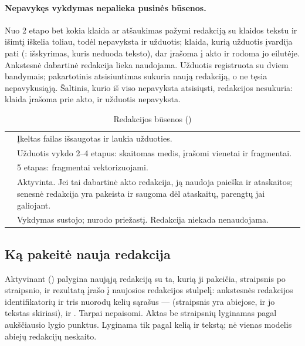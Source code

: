 \paragraph{Nepavykęs vykdymas nepalieka pusinės būsenos.} Nuo 2 etapo bet kokia klaida ar
atšaukimas pažymi redakciją  su klaidos tekstu ir išimtį iškelia toliau, todėl
nepavyksta ir užduotis; klaida, kurią užduotis įvardija pati (: išskyrimas, kuris
neduoda teksto), dar įrašoma į akto  ir rodoma jo eilutėje. Ankstesnė dabartinė
redakcija lieka naudojama. Užduotis registruota su dviem bandymais; pakartotinis atsisiuntimas
sukuria naują redakciją, o ne tęsia nepavykusiąją. Šaltinis, kurio iš viso nepavyksta atsisiųsti,
redakcijos nesukuria: klaida įrašoma prie akto, ir užduotis nepavyksta.

\begin{table}[H]
\caption{Redakcijos būsenos ()}\label{tab:corpus:status}
\begin{tabularx}{\textwidth}{@{}L{22mm}Y@{}}
\toprule
{} &  \\
\midrule
{} & Įkeltas failas išsaugotas ir laukia užduoties. \\
 & Užduotis vykdo 2--4 etapus: skaitomas medis, įrašomi vienetai ir fragmentai. \\
 & 5 etapas: fragmentai vektorizuojami. \\
 & Aktyvinta. Jei tai dabartinė akto redakcija, ją naudoja paieška ir ataskaitos; senesnė  redakcija yra pakeista ir saugoma dėl ataskaitų, parengtų jai galiojant. \\
 & Vykdymas sustojo;  nurodo priežastį. Redakcija niekada nenaudojama. \\
\bottomrule
\end{tabularx}
\end{table}

\subsection{Ką pakeitė nauja redakcija}\label{sec:corpus:changes}

Aktyvinant  () palygina naująją redakciją su ta,
kurią ji pakeičia, straipsnis po straipsnio, ir rezultatą įrašo į naujosios redakcijos
 stulpelį: ankstesnės redakcijos identifikatorių ir tris nuorodų kelių sąrašus ---
 (straipsnis yra abiejose, ir jo tekstas skiriasi),  ir
. Tarpai nepaisomi. Aktas be straipsnių lyginamas pagal aukščiausio lygio punktus.
Lyginama tik pagal kelią ir tekstą; nė vienas modelis abiejų redakcijų neskaito.

